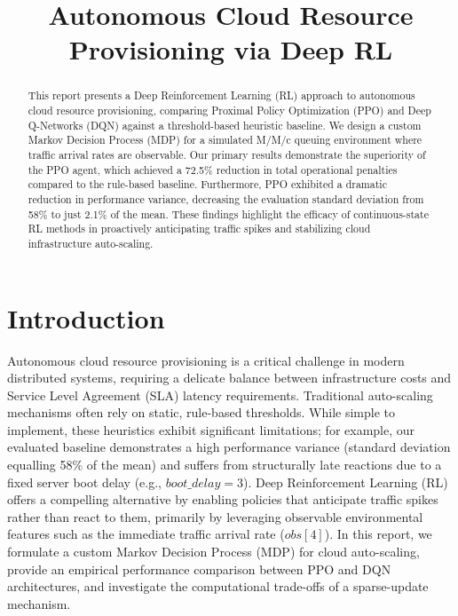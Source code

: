 \documentclass[conference]{IEEEtran}
\begin{document}
\title{Autonomous Cloud Resource Provisioning via Deep RL}

\author{
}

\maketitle

\begin{abstract}
This report presents a Deep Reinforcement Learning (RL) approach to autonomous cloud resource provisioning, comparing Proximal Policy Optimization (PPO) and Deep Q-Networks (DQN) against a threshold-based heuristic baseline. We design a custom Markov Decision Process (MDP) for a simulated M/M/c queuing environment where traffic arrival rates are observable. Our primary results demonstrate the superiority of the PPO agent, which achieved a 72.5\% reduction in total operational penalties compared to the rule-based baseline. Furthermore, PPO exhibited a dramatic reduction in performance variance, decreasing the evaluation standard deviation from 58\% to just 2.1\% of the mean. These findings highlight the efficacy of continuous-state RL methods in proactively anticipating traffic spikes and stabilizing cloud infrastructure auto-scaling.
\end{abstract}

\section{Introduction}
Autonomous cloud resource provisioning is a critical challenge in modern distributed systems, requiring a delicate balance between infrastructure costs and Service Level Agreement (SLA) latency requirements. Traditional auto-scaling mechanisms often rely on static, rule-based thresholds. While simple to implement, these heuristics exhibit significant limitations; for example, our evaluated baseline demonstrates a high performance variance (standard deviation equalling 58\% of the mean) and suffers from structurally late reactions due to a fixed server boot delay (e.g., $boot\_delay=3$). Deep Reinforcement Learning (RL) offers a compelling alternative by enabling policies that anticipate traffic spikes rather than react to them, primarily by leveraging observable environmental features such as the immediate traffic arrival rate ($obs[4]$). In this report, we formulate a custom Markov Decision Process (MDP) for cloud auto-scaling, provide an empirical performance comparison between PPO and DQN architectures, and investigate the computational trade-offs of a sparse-update mechanism.
\end{document}
